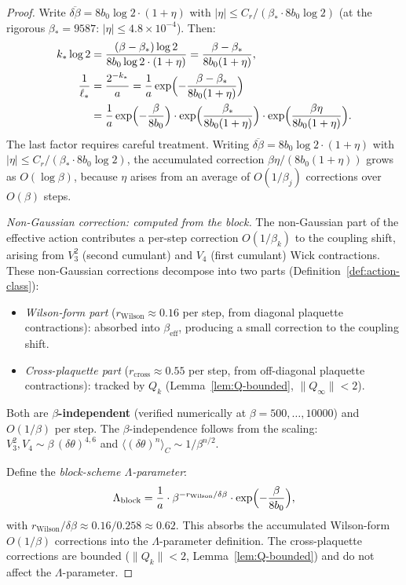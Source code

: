 \documentclass[11pt]{article}
\theoremstyle{definition}
\begin{document}
\begin{proof}
Write $\overline{\delta\beta}=8b_0\log 2\cdot(1+\eta)$ with
$|\eta|\le C_r/(\beta_*\cdot 8b_0\log 2)$
(at the rigorous $\beta_*=9587$: $|\eta|\le 4.8\times 10^{-4}$).
Then:
\begin{align*}
k_*\log 2
&=\frac{(\beta-\beta_*)\log 2}{8b_0\log 2\cdot(1+\eta)}
=\frac{\beta-\beta_*}{8b_0(1+\eta)},\\
\frac{1}{\ell_*}
&=\frac{2^{-k_*}}{a}
=\frac{1}{a}\exp\Bigl(-\frac{\beta-\beta_*}{8b_0(1+\eta)}\Bigr)\\
&=\frac{1}{a}\exp\Bigl(-\frac{\beta}{8b_0}\Bigr)
\cdot\exp\Bigl(\frac{\beta_*}{8b_0(1+\eta)}\Bigr)
\cdot\exp\Bigl(\frac{\beta\eta}{8b_0(1+\eta)}\Bigr).
\end{align*}
The last factor requires careful treatment.
Writing $\overline{\delta\beta}=8b_0\log 2\cdot(1+\eta)$
with $|\eta|\le C_r/(\beta_*\cdot 8b_0\log 2)$, the accumulated correction
$\beta\eta/(8b_0(1+\eta))$ grows as $O(\log\beta)$,
because $\eta$ arises from an average of $O(1/\beta_j)$
corrections over $O(\beta)$ steps.

\emph{Non-Gaussian correction: computed from the block.}
The non-Gaussian part of the effective action contributes
a per-step correction $O(1/\beta_k)$ to the
coupling shift, arising from $V_3^2$ (second cumulant) and
$V_4$ (first cumulant) Wick contractions.
These non-Gaussian corrections decompose into two parts
(Definition~\ref{def:action-class}):
\begin{itemize}[nosep]
\item \emph{Wilson-form part}
($r_{\mathrm{Wilson}}\approx 0.16$ per step,
from diagonal plaquette contractions):
absorbed into $\beta_{\mathrm{eff}}$,
producing a small correction to the coupling shift.
\item \emph{Cross-plaquette part}
($r_{\mathrm{cross}}\approx 0.55$ per step,
from off-diagonal plaquette contractions):
tracked by $Q_k$ (Lemma~\ref{lem:Q-bounded},
$\|Q_\infty\|<2$).
\end{itemize}
Both are \textbf{$\beta$-independent} (verified numerically
at $\beta=500,\ldots,10000$) and $O(1/\beta)$ per step.
The $\beta$-independence follows from the scaling:
$V_3^2,V_4\sim\beta\,(\delta\theta)^{4,6}$ and
$\langle(\delta\theta)^n\rangle_C\sim 1/\beta^{n/2}$.

Define the \emph{block-scheme $\Lambda$-parameter}:
\begin{equation}\label{eq:Lambda-2loop}
\Lambda_{\mathrm{block}}
=\frac{1}{a}\cdot\beta^{-r_{\mathrm{Wilson}}/\delta\beta}
\cdot\exp\Bigl(-\frac{\beta}{8b_0}\Bigr),
\end{equation}
with $r_{\mathrm{Wilson}}/\delta\beta\approx 0.16/0.258
\approx 0.62$.
This absorbs the accumulated Wilson-form $O(1/\beta)$
corrections into the $\Lambda$-parameter definition.
The cross-plaquette corrections are bounded
($\|Q_k\|<2$, Lemma~\ref{lem:Q-bounded}) and do not
affect the $\Lambda$-parameter.


\end{proof}
\end{document}

